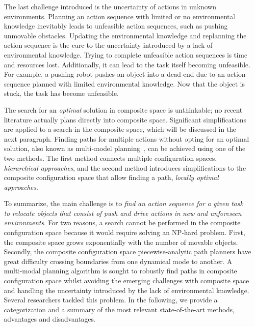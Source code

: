 The last challenge introduced is the uncertainty of actions in unknown environments. Planning an action sequence with limited or no environmental knowledge inevitably leads to unfeasible action sequences, such as pushing unmovable obstacles. Updating the environmental knowledge and replanning the action sequence is the cure to the uncertainty introduced by a lack of environmental knowledge. Trying to complete unfeasible action sequences is time and resources lost. Additionally, it can lead to the task itself becoming unfeasible. For example, a pushing robot pushes an object into a dead end due to an action sequence planned with limited environmental knowledge. Now that the object is stuck, the task has become unfeasible.\bs

The search for an \textit{optimal} solution in composite space is unthinkable; no recent literature actually plans directly into composite space. Significant simplifications are applied to a search in the composite space, which will be discussed in the next paragraph. Finding paths for multiple actions without opting for an optimal solution, also known as multi-model planning~\cite{hauser_multimodal_2010}, can be achieved using one of the two methods. The first method connects multiple configuration spaces, \textit{hierarchical approaches}, and the second method introduces simplifications to the composite configuration space that allow finding a path, \textit{locally optimal approaches}.\bs

To summarize, the main challenge is to \textit{find an action sequence for a given task to relocate objects that consist of push and drive actions in new and unforeseen environments}. For two reasons, a search cannot be performed in the composite configuration space because it would require solving an \ac{NP-hard} problem. First, the composite space grows exponentially with the number of movable objects. Secondly, the composite configuration space piecewise-analytic path planners have great difficulty crossing boundaries from one dynamical mode to another. A multi-modal planning algorithm is sought to robustly find paths in composite configuration space whilst avoiding the emerging challenges with composite space and handling the uncertainty introduced by the lack of environmental knowledge. Several researchers tackled this problem. In the following, we provide a categorization and a summary of the most relevant state-of-the-art methods, advantages and disadvantages.

